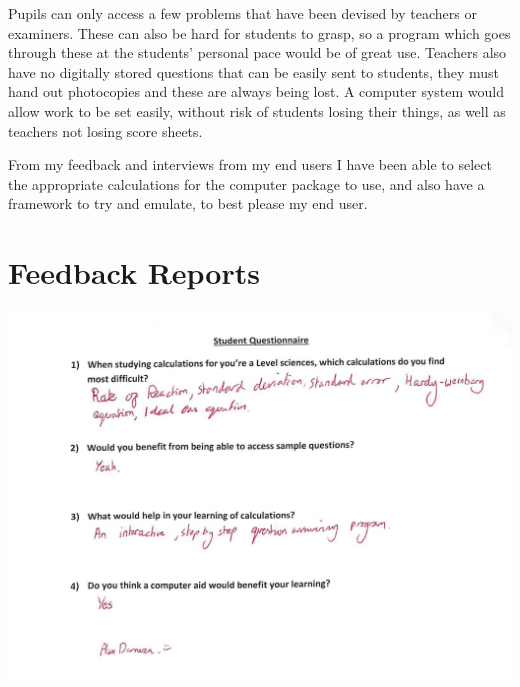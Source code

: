 \documentclass[a4paper,12pt]{report}
\begin{document}
Pupils can only access a few problems that have been devised by teachers or examiners. These can also be hard for students to grasp, so a program which goes through these at the students’ personal pace would be of great use. Teachers also have no digitally stored questions that can be easily sent to students, they must hand out photocopies and these are always being lost. A computer system would allow work to be set easily, without risk of students losing their things, as well as teachers not losing score sheets.\bigskip

From my feedback and interviews from my end users I have been able to select the appropriate calculations for the computer package to use, and also have a framework to try and emulate, to best please my end user.\\


\section{Feedback Reports}
\includegraphics{StudentQuestionnaire}
\end{document}
